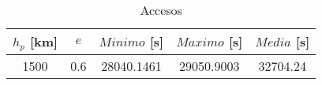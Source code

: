\begin{table}[H] 
\centering 
\captionsetup{justification=centering,margin=10mm} 
\caption{Accesos} 
	{\renewcommand{\arraystretch}{1.2} 
	\begin{tabular}{ccccc} 
		$h_p$ [km] & $e$ & $Minimo$ [s] & $Maximo$ [s] & $Media$ [s] \\ 
		\hline 
		1500 & 0.6 & 28040.1461 & 29050.9003 & 32704.24 \\ 
		\hline 
	\end{tabular} 
	} 
\label{tab:accesos} 
\end{table}